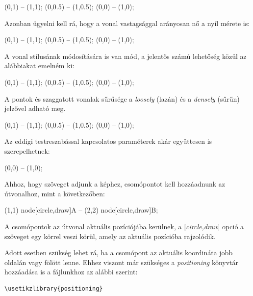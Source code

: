 \begin{tikzcode}
\draw [thin] (0,1) -- (1,1);
\draw [thick] (0,0.5) -- (1,0.5);	
 (0,0) -- (1,0);
\end{tikzcode}

Azonban ügyelni kell rá, hogy a vonal vastagsággal arányosan nő a nyíl mérete is:

\begin{tikzcode}
\draw [->, thin] (0,1) -- (1,1);
\draw [->, thick] (0,0.5) -- (1,0.5);	
 (0,0) -- (1,0);
\end{tikzcode}

A vonal stílusának módosítására is van mód, a jelentős számú lehetőség közül az alábbiakat emelném ki:

\begin{tikzcode}
\draw [dotted] (0,1) -- (1,1);
\draw [dashed] (0,0.5) -- (1,0.5);	
\draw [dashdotted] (0,0) -- (1,0);
\end{tikzcode}

A pontok és szaggatott vonalak sűrűsége a \textit{loosely} (lazán) és a \textit{densely} (sűrűn) jelzővel adható meg.
\begin{tikzcode}
\draw [dashed] (0,1) -- (1,1);
 (0,0.5) -- (1,0.5);	
 (0,0) -- (1,0);
\end{tikzcode}

Az eddigi testreszabással kapcsolatos paraméterek akár együttesen is szerepelhetnek:

\begin{tikzcode}
 (0,0) -- (1,0);
\end{tikzcode}

Ahhoz, hogy szöveget adjunk a képhez, csomópontot kell hozzáadnunk az útvonalhoz, mint a következőben:

\begin{tikzcode}
\draw 
    (1,1) node[circle,draw]{A} 
        -- 
    (2,2) node[circle,draw]{B};	
\end{tikzcode}

A csomópontok az útvonal aktuális pozíciójába kerülnek, a [\textit{circle,draw}] opció a szöveget egy körrel veszi körül, amely az aktuális pozícióba rajzolódik.

Adott esetben szükség lehet rá, ha a csomópont az aktuális koordináta jobb oldalán vagy fölött lenne. Ehhez viszont már szükséges a \textit{positioning} könyvtár hozzáadása is a fájlunkhoz az alábbi szerint:

\begin{lstlisting}[style=latex]
\usetikzlibrary{positioning}
\end{lstlisting}

